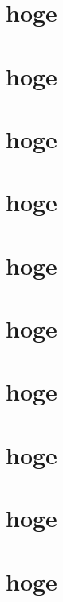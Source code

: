 \documentclass[
    paper=a4paper,      %
    report,             %
    fleqn,              %
    fontsize=12pt,      %
    jafontsize=12pt,    %
    head_space=33mm,    %
    foot_space=30mm,    %
    gutter=25mm,        %
    fore-edge=10mm      %
    ]{jlreq}            %
\begin{document}
\chapter{hoge}

\chapter{hoge}

\chapter{hoge}

\chapter{hoge}

\chapter{hoge}

\chapter{hoge}

\chapter{hoge}

\chapter{hoge}

\chapter{hoge}

\chapter{hoge}





\acknowledge

\lipsum[1-20]


\biblist


\end{document}
